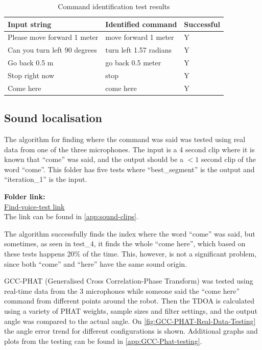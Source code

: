 \begin{table} [h]
    \centering
    \begin{tabular}{l l | l}
        \toprule
        \textbf{Input string} & \textbf{Identified command} & \textbf{Successful} \\
        \midrule
        Please move forward 1 meter & move forward 1 meter & Y \\
        Can you turn left 90 degrees & turn left 1.57 radians & Y \\
        Go back 0.5 m & go back 0.5 meter & Y \\
        Stop right now & stop & Y \\
        Come here & come here & Y \\
        \bottomrule
    \end{tabular}
    \caption{Command identification test results}
    \label{tab:commandidentificationtest}
\end{table}

\subsection{Sound localisation}
The algorithm for finding where the command was said was tested using real data from one of the three microphones. The input is a 4 second clip where it is known that ``come'' was said, and the output should be a $<1$ second clip of the word ``come''. This folder has five tests where ``best\_segment'' is the output and ``iteration\_1'' is the input. 

\textbf{Folder link:} \\
\href{https://github.com/Lukas4314/3-Semester-project/tree/main/find_voice}{Find-voice-test link} \\
The link can be found in \cref{app:sound-clips}.

The algorithm successfully finds the index where the word ``come'' was said, but sometimes, as seen in test\_4, it finds the whole ``come here'', which based on these tests happens 20\% of the time. This, however, is not a significant problem, since both ``come'' and ``here'' have the same sound origin.

GCC-PHAT (Generalised Cross Correlation-Phase Transform) was tested using real-time data from the 3 microphones while someone said the ``come here'' command from different points around the robot. Then the TDOA is calculated using a variety of PHAT weights, sample sizes and filter settings, and the output angle was compared to the actual angle. On \cref{fig:GCC-PHAT-Real-Data-Testing} the angle error trend for different configurations is shown. Additional graphs and plots from the testing can be found in \cref{app:GCC-Phat-testing}.

